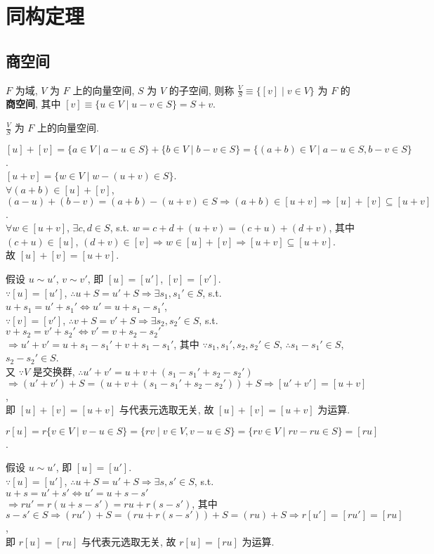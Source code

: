 \documentclass{note}
\begin{document}
\fi
\chapter{同构定理}
\section{商空间}
\begin{df}[商空间]
    $F$ 为域, $V$ 为 $F$ 上的向量空间, $S$ 为 $V$ 的子空间, 则称 $\frac{V}{S}\equiv\{[v]\mid v\in V\}$ 为 $F$ 的\textbf{商空间}, 其中 $[v]\equiv\{u\in V\mid u-v\in S\}=S+v$.
\end{df}

$\frac{V}{S}$ 为 $F$ 上的向量空间.
\begin{pf}
    $[u]+[v]=\{a\in V\mid a-u\in S\}+\{b\in V\mid b-v\in S\}=\{(a+b)\in V\mid a-u\in S,b-v\in S\}$.\\
    $[u+v]=\{w\in V\mid w-(u+v)\in S\}$.\\
    $\forall(a+b)\in[u]+[v]$, $(a-u)+(b-v)=(a+b)-(u+v)\in S\Longrightarrow(a+b)\in[u+v]\Longrightarrow[u]+[v]\subseteq[u+v]$.\\
    $\forall w\in[u+v]$, $\exists c,d\in S$, s.t. $w=c+d+(u+v)=(c+u)+(d+v)$, 其中 $(c+u)\in[u]$, $(d+v)\in[v]\Longrightarrow w\in[u]+[v]\Longrightarrow[u+v]\subseteq[u+v]$.\\
    故 $[u]+[v]=[u+v]$.

    假设 $u\sim u'$, $v\sim v'$, 即 $[u]=[u']$, $[v]=[v']$.\\
    $\because[u]=[u']$, $\therefore u+S=u'+S\Longrightarrow\exists s_1,s_1'\in S$, s.t. $u+s_1=u'+s_1'\Longleftrightarrow u'=u+s_1-s_1'$,\\
    $\because[v]=[v']$, $\therefore v+S=v'+S\Longrightarrow\exists s_2,s_2'\in S$, s.t. $v+s_2=v'+s_2'\Longleftrightarrow v'=v+s_2-s_2'$\\
    $\Longrightarrow u'+v'=u+s_1-s_1'+v+s_1-s_1'$, 其中 $\because s_1,s_1',s_2,s_2'\in S$, $\therefore s_1-s_1'\in S$, $s_2-s_2'\in S$.\\
    又 $\because V$ 是交换群, $\therefore u'+v'=u+v+(s_1-s_1'+s_2-s_2')$\\
    $\Longrightarrow(u'+v')+S=(u+v+(s_1-s_1'+s_2-s_2'))+S\Longrightarrow[u'+v']=[u+v]$,\\
    即 $[u]+[v]=[u+v]$ 与代表元选取无关, 故 $[u]+[v]=[u+v]$ 为运算.

    $r[u]=r\{v\in V\mid v-u\in S\}=\{rv\mid v\in V,v-u\in S\}=\{rv\in V\mid rv-ru\in S\}=[ru]$.

    假设 $u\sim u'$, 即 $[u]=[u']$.\\
    $\because[u]=[u']$, $\therefore u+S=u'+S\Longrightarrow\exists s,s'\in S$, s.t. $u+s=u'+s'\Longleftrightarrow u'=u+s-s'$\\
    $\Longrightarrow ru'=r(u+s-s')=ru+r(s-s')$, 其中 $s-s'\in S\Longrightarrow(ru')+S=(ru+r(s-s'))+S=(ru)+S\Longrightarrow r[u']=[ru']=[ru]$,\\
    即 $r[u]=[ru]$ 与代表元选取无关, 故 $r[u]=[ru]$ 为运算.


\end{pf}
\end{document}
